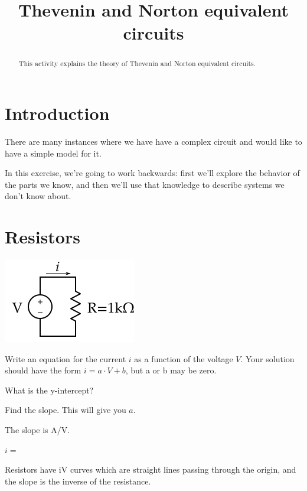 \documentclass{ximera}
\title{Thevenin and Norton equivalent circuits}
\begin{document}
\begin{abstract}
This activity explains the theory of Thevenin and Norton equivalent circuits.
\end{abstract}

\maketitle

\section{Introduction}
There are many instances where we have have a complex circuit and would like to have a simple model for it.

In this exercise, we're going to work backwards: first we'll explore the behavior of the parts we know, and then we'll use that knowledge to describe systems we don't know about.

\section{Resistors}

\begin{exercise}
\includegraphics{figures/single_resistor.svg}

Write an equation for the current $i$ as a function of the voltage $V$.  Your solution should have the form $i = a \cdot V + b$, but a or b may be zero.

\begin{solution}
  \begin{hint}
    \begin{prompt}
      What is the y-intercept? 
    \end{prompt}
  \end{hint}
  \begin{hint}
    Find the slope.  This will give you $a$.
    \begin{prompt}
      The slope is  A/V.
    \end{prompt}
  \end{hint}
  
  $i = $ 
\end{solution}

Resistors have iV curves which are straight lines passing through the origin, and the slope is the inverse of the resistance.
\end{exercise}
\end{document}
